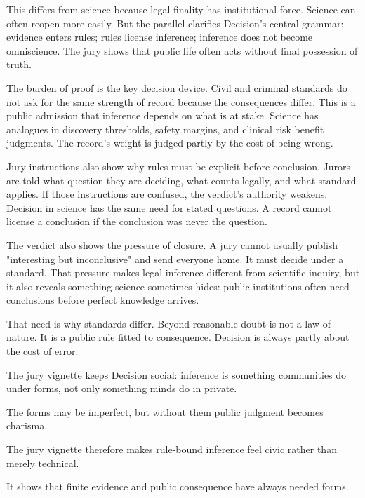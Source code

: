 This differs from science because legal finality has institutional force.
Science can often reopen more easily. But the parallel clarifies Decision's
central grammar: evidence enters rules; rules license inference; inference
does not become omniscience. The jury shows that public life often acts
without final possession of truth.

The burden of proof is the key decision device. Civil and criminal standards
do not ask for the same strength of record because the consequences differ.
This is a public admission that inference depends on what is at stake. Science
has analogues in discovery thresholds, safety margins, and clinical risk
benefit judgments. The record's weight is judged partly by the cost of being
wrong.

Jury instructions also show why rules must be explicit before conclusion.
Jurors are told what question they are deciding, what counts legally, and what
standard applies. If those instructions are confused, the verdict's authority
weakens. Decision in science has the same need for stated questions. A record
cannot license a conclusion if the conclusion was never the question.

The verdict also shows the pressure of closure. A jury cannot usually publish
"interesting but inconclusive" and send everyone home. It must decide under a
standard. That pressure makes legal inference different from scientific
inquiry, but it also reveals something science sometimes hides: public
institutions often need conclusions before perfect knowledge arrives.

That need is why standards differ. Beyond reasonable doubt is not a law of
nature. It is a public rule fitted to consequence. Decision is always partly
about the cost of error.

The jury vignette keeps Decision social: inference is something
communities do under forms, not only something minds do in private.

The forms may be imperfect, but without them public judgment becomes charisma.

The jury vignette therefore makes rule-bound inference feel civic rather than
merely technical.

It shows that finite evidence and public consequence have always needed
forms.

